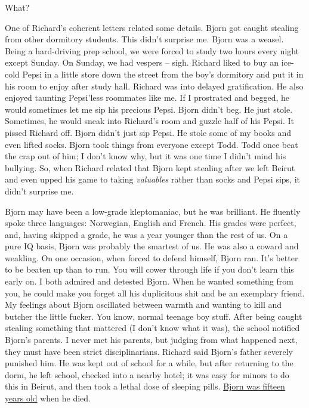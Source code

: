 What?

One of Richard's coherent letters related some details. Bjorn got caught
stealing from other dormitory students. This didn't surprise me. Bjorn
was a weasel. Being a hard-driving prep school, we were forced to study
two hours every night except Sunday. On Sunday, we had vespers -- sigh.
Richard liked to buy an ice-cold Pepsi in a little store down the street
from the boy's dormitory and put it in his room to enjoy after study
hall. Richard was into delayed gratification. He also enjoyed taunting
Pepsi'less roommates like me. If I prostrated and begged, he would
sometimes let me sip his precious Pepsi. Bjorn didn't beg. He just
stole. Sometimes, he would sneak into Richard's room and guzzle half of
his Pepsi. It pissed Richard off. Bjorn didn't just sip Pepsi. He stole
some of my books and even lifted socks. Bjorn took things from everyone
except Todd. Todd once beat the crap out of him; I don't know why, but
it was one time I didn't mind his bullying. So, when Richard related
that Bjorn kept stealing after we left Beirut and even upped his game to
taking \emph{valuables} rather than socks and Pepsi sips, it didn't
surprise me.

Bjorn may have been a low-grade kleptomaniac, but he was brilliant. He
fluently spoke three languages: Norwegian, English and French. His
grades were perfect, and, having skipped a grade, he was a year younger
than the rest of us. On a pure IQ basis, Bjorn was probably the smartest
of us. He was also a coward and weakling. On one occasion, when forced
to defend himself, Bjorn ran. It's better to be beaten up than to run.
You will cower through life if you don't learn this early on. I both
admired and detested Bjorn. When he wanted something from you, he could
make you forget all his duplicitous shit and be an exemplary friend. My
feelings about Bjorn oscillated between warmth and wanting to kill and
butcher the little fucker. You know, normal teenage boy stuff. After
being caught stealing something that mattered (I don't know what it
was), the school notified Bjorn's parents. I never met his parents, but
judging from what happened next, they must have been strict
disciplinarians. Richard said Bjorn's father severely punished him. He
was kept out of school for a while, but after returning to the dorm, he
left school, checked into a nearby hotel; it was easy for minors to do
this in Beirut, and then took a lethal dose of sleeping pills.
\href{https://www.findagrave.com/memorial/244135118/bjorn_erik-hopen/flower}{Bjorn
was fifteen years old} when he died.


